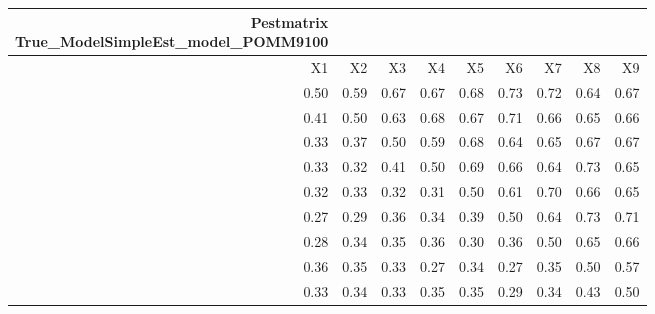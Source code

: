 \begin{longtable}{rrrrrrrrr}
\caption*{
{\large Pestmatrix} \\ 
{\small True\_ModelSimpleEst\_model\_POMM9100}
} \\ 
\toprule
X1 & X2 & X3 & X4 & X5 & X6 & X7 & X8 & X9 \\ 
\midrule
0.50 & 0.59 & 0.67 & 0.67 & 0.68 & 0.73 & 0.72 & 0.64 & 0.67 \\ 
0.41 & 0.50 & 0.63 & 0.68 & 0.67 & 0.71 & 0.66 & 0.65 & 0.66 \\ 
0.33 & 0.37 & 0.50 & 0.59 & 0.68 & 0.64 & 0.65 & 0.67 & 0.67 \\ 
0.33 & 0.32 & 0.41 & 0.50 & 0.69 & 0.66 & 0.64 & 0.73 & 0.65 \\ 
0.32 & 0.33 & 0.32 & 0.31 & 0.50 & 0.61 & 0.70 & 0.66 & 0.65 \\ 
0.27 & 0.29 & 0.36 & 0.34 & 0.39 & 0.50 & 0.64 & 0.73 & 0.71 \\ 
0.28 & 0.34 & 0.35 & 0.36 & 0.30 & 0.36 & 0.50 & 0.65 & 0.66 \\ 
0.36 & 0.35 & 0.33 & 0.27 & 0.34 & 0.27 & 0.35 & 0.50 & 0.57 \\ 
0.33 & 0.34 & 0.33 & 0.35 & 0.35 & 0.29 & 0.34 & 0.43 & 0.50 \\ 
\bottomrule
\end{longtable}

